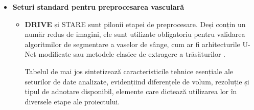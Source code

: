 \documentclass[12pt, a4paper, oneside, romanian]{teza-upb}
\begin{document}
\begin{itemize}
  \item \textbf{Seturi standard pentru preprocesarea vasculară}
  
        \begin{itemize}
          \item \textbf{DRIVE} \cite{13_staal2004ridge} și STARE \cite{9_chetoui2020explainable} sunt pilonii etapei de preprocesare.
                Deși conțin un număr redus de imagini, ele sunt utilizate obligatoriu pentru validarea algoritmilor de
                segmentare a vaselor de sânge, cum ar fi arhitecturile U-Net modificate \cite{12_sambyal2020modified} sau metodele clasice de
                extragere a trăsăturilor \cite{1_niemeijer2005automatic}.

                Tabelul de mai jos sintetizează caracteristicile tehnice esențiale ale seturilor de date analizate,
                evidențiind diferențele de volum, rezoluție și tipul de adnotare disponibil, elemente care dictează
                utilizarea lor în diversele etape ale proiectului.


\end{itemize}
\end{itemize}
\end{document}
